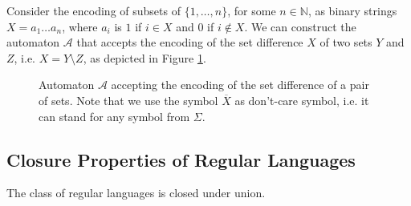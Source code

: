 	\noindent\hrulefill
	\begin{example}
	Consider the encoding of subsets of $\{1,\ldots,n\}$, for some $n \in
	\mathbb{N}$, as binary strings $X = a_1\ldots a_n$, where $a_i$ is $1$ if $i \in X$ and $0$ if
	$i \notin X$. We can construct the automaton $\mathcal{A}$ that accepts the
	encoding of the set difference $X$ of two sets $Y$ and $Z$, i.e. $X = Y
	\setminus Z$, as depicted in Figure \ref{set-automaton}.
	
	\begin{figure}[h!]
	\begin{center}
	 \end{center}
	 \caption{Automaton $\mathcal{A}$ accepting the encoding of the set difference
	 of a pair of sets. Note that we use the symbol $\overline{X}$ as
	 don't-care symbol, i.e. it can stand for any symbol
	 from $\Sigma$.}\label{set-automaton}
	\end{figure}
	\end{example}
	
	\noindent\hrulefill
	\newpage
 \subsection{Closure Properties of Regular Languages}

\begin{theorem}
 The class of regular languages is closed under union.
\end{theorem}

